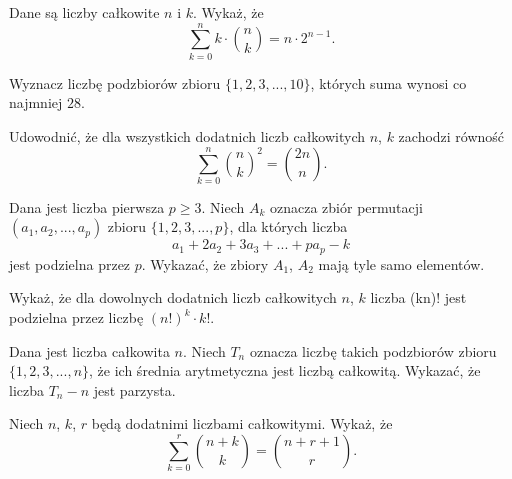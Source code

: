 \begin{problem}{1} 
	Dane są liczby całkowite $n$ i $k$. Wykaż, że
	\[
		\sum^{n}_{k=0} k \cdot {{n}\choose{k}} = n \cdot 2^{n - 1}.
	\]
\end{problem}

\begin{problem}{2}
	Wyznacz liczbę podzbiorów zbioru $\{1, 2, 3, ..., 10\}$, których suma wynosi co najmniej $28$.
\end{problem}

\begin{problem}{3} 
	Udowodnić, że dla wszystkich dodatnich liczb całkowitych $n$, $k$ zachodzi równość
	\[
	    \sum^{n}_{k=0} {{n}\choose{k}}^2 = {{2n}\choose{n}}.
	\]
\end{problem}

\begin{problem}{4}
	Dana jest liczba pierwsza $p \geqslant 3$. Niech $A_k$ oznacza zbiór permutacji $(a_1, a_2, ..., a_p)$ zbioru $\{1, 2, 3,..., p\}$, dla których liczba
	\[
		a_1 + 2a_2 + 3a_3 + ... + pa_p - k
	\]
	jest podzielna przez $p$. Wykazać, że zbiory $A_1$, $A_2$ mają tyle samo elementów.
\end{problem}

\begin{problem}{5}
	Wykaż, że dla dowolnych dodatnich liczb całkowitych $n$, $k$ liczba	(kn)!
	jest podzielna przez liczbę $(n!)^k \cdot k!$.
\end{problem}


\begin{problem}{6}
	Dana jest liczba całkowita $n$. Niech $T_n$ oznacza liczbę takich podzbiorów zbioru $\{1, 2, 3, ..., n\}$, że ich średnia arytmetyczna jest liczbą całkowitą. Wykazać, że liczba $T_n - n$ jest parzysta.
\end{problem}


\begin{problem}{7}
	Niech $n$, $k$, $r$ będą dodatnimi liczbami całkowitymi. Wykaż, że
	\[
		\sum^{r}_{k=0} {{n + k}\choose{k}} = {{n + r + 1}\choose{r}} .
	\]
\end{problem}

